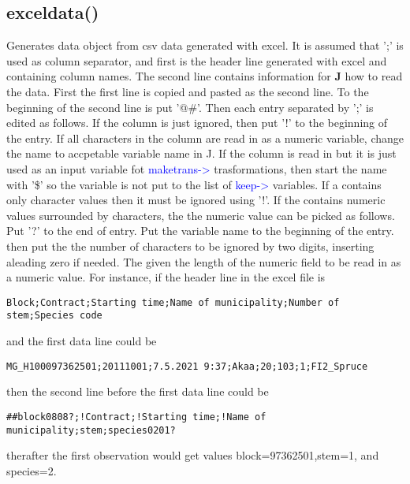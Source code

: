 \subsection{exceldata()}
\label{exceldata}
Generates data object from csv data generated with excel. It is assumed that ';' is used as column separator,
 and first is the header line generated with excel and containing column names.
The second line contains information for \textbf{J} how to read the data.
First the first line is copied and pasted as the second line. To the beginning of the second line is put
 '@\#'. Then each entry separated by ';' is edited as follows. If the column is just ignored, then
 put '!' to the beginning of the entry. If all characters in the column are read in as
 a numeric variable, change the name to accpetable variable name in J.
 If the column is read in but it is just used as an input variable fot
\textcolor{blue}{maketrans->} trasformations, then start the name with '\$' so the variable is not put to
 the list of \textcolor{blue}{keep->} variables. If a contains only character values then it must
 be ignored using '!'. If the contains numeric values surrounded by characters, the the numeric value can be picked
 as follows. Put '?' to the end of entry. Put the variable name to the beginning of the entry.
 then put the the number of characters to be ignored by two digits, inserting
 aleading zero if needed. The given the length of the numeric field to be read in as a numeric value.
 For instance, if the header line in the excel file is
\color{Green}
\begin{verbatim}
Block;Contract;Starting time;Name of municipality;Number of stem;Species code
\end{verbatim}
\color{Black}
 and the first data line could be
\color{Green}
\begin{verbatim}
MG_H100097362501;20111001;7.5.2021 9:37;Akaa;20;103;1;FI2_Spruce
\end{verbatim}
\color{Black}
 then the second line before the first data line could be
\color{Green}
\begin{verbatim}
##block0808?;!Contract;!Starting time;!Name of municipality;stem;species0201?
\end{verbatim}
\color{Black}
 therafter the first observation would get values block=97362501,stem=1, and
species=2.

